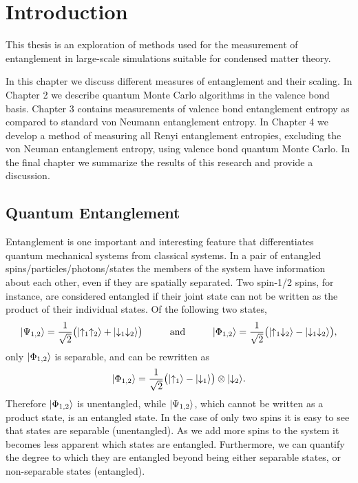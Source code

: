 \chapter{Introduction}
This thesis is an exploration of methods used for the measurement of entanglement in large-scale simulations suitable for condensed matter theory.

In this chapter we discuss different measures of entanglement and their scaling.
In Chapter 2 we describe quantum Monte Carlo algorithms in the valence bond basis.
Chapter 3 contains measurements of valence bond entanglement entropy as compared to standard von Neumann entanglement entropy.
In Chapter 4 we develop a method of measuring all Renyi entanglement entropies, excluding the von Neuman entanglement entropy, using valence bond quantum Monte Carlo.
In the final chapter we summarize the results of this research and provide a discussion.

\section{Quantum Entanglement}
Entanglement is one important and interesting feature that differentiates quantum mechanical systems from classical systems.
In a pair of entangled spins/particles/photons/states the members of the system have information about each other, even if they are spatially separated.
Two spin-1/2 spins, for instance, are considered entangled if their joint state can not be written as the product of their individual states.  Of the following two states,
\begin{equation}
	\lvert {\Psi_{1,2}} \rangle = \frac{1}{\sqrt{2}} \big( \lvert {\uparrow_1\uparrow_2} \rangle + \lvert {\downarrow_1\downarrow_2} \rangle\big) 
	\hspace{1cm} \text{and} \hspace{1cm}
	\lvert {\Phi_{1,2}} \rangle = \frac{1}{\sqrt{2}} \big( \lvert {\uparrow_1\downarrow_2} \rangle - \lvert {\downarrow_1\downarrow_2} \rangle\big), 
\end{equation}
only $\lvert {\Phi_{1,2}} \rangle$ is separable, and can be rewritten as
\begin{equation}
	\lvert {\Phi_{1,2}} \rangle = \frac{1}{\sqrt{2}}  \big( \lvert {\uparrow_1} \rangle - \lvert {\downarrow_1} \rangle\big) \otimes \lvert {\downarrow_2} \rangle.
\end{equation}
Therefore $\lvert {\Phi_{1,2}} \rangle$ is unentangled, while $\lvert {\Psi_{1,2}} \rangle$, which cannot be written as a product state, is an entangled state.
In the case of only two spins it is easy to see that states are separable (unentangled). As we add more spins to the system it becomes less apparent which  states are entangled. Furthermore, we can quantify the degree to which they are entangled beyond being either separable states, or non-separable states (entangled).

